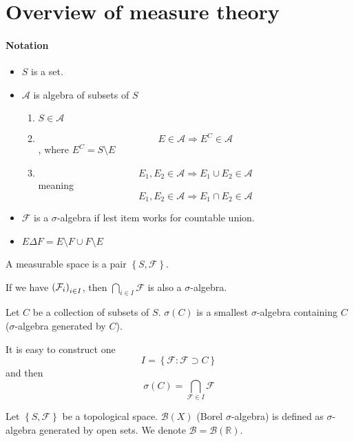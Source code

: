 \section{Overview of measure theory}
\paragraph{Notation}
\begin{itemize}
	\item $S$ is a set.
	\item $\mathcal{A}$ is algebra of subsets of $S$
	\begin{enumerate}
		\item $S\in \mathcal{A}$
		\item $$E\in \mathcal{A} \Rightarrow E^C\in \mathcal{A}$$, where $E^C = S \setminus E$
		\item $$E_1, E_2 \in \mathcal{A} \Rightarrow E_1 \cup E_2 \in \mathcal{A}$$
		meaning
		$$E_1, E_2 \in \mathcal{A} \Rightarrow E_1 \cap E_2 \in \mathcal{A}$$
	\end{enumerate}
\item $\mathcal{F}$ is a $\sigma$-algebra if lest item works for countable union.
\item $E\Delta F = E\setminus F \cup F \setminus E$ 
\end{itemize}

\begin{definition}
	A measurable space is a pair $\left\{S,\mathcal{F}\right\}$.
\end{definition}

\begin{prop}
	If we have $\qty(\mathcal{F}_i)_{i\in I}$, then $\bigcap_{i\in I} \mathcal{F} $ is also a $\sigma$-algebra.
\end{prop}

\begin{definition}
	Let $C$ be a collection of subsets of $S$. $\sigma(C)$ is a smallest $\sigma$-algebra containing $C$ ($\sigma$-algebra generated by $C$).
	
	It is easy to construct one
	$$I = \left\{ \mathcal{F} :\mathcal{F} \supset C \right\}$$
	and then
	$$\sigma(C) = \bigcap_{\mathcal{F}\in I} \mathcal{F}$$
\end{definition}

\begin{definition}
	Let $\left\{S,\mathcal{F}\right\}$ be a topological space. $\mathcal{B}(X)$ (Borel $\sigma$-algebra) is defined as $\sigma$-algebra generated by open sets. We denote
	$\mathcal{B} = \mathcal{B}(\mathbb{R})$.
\end{definition}
